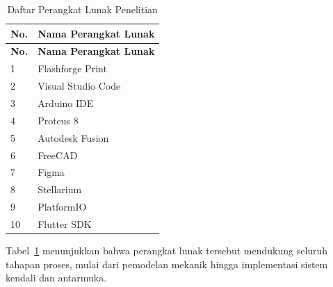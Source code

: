 \begin{longtable}{| b{}|p{}|} %
	\caption{Daftar Perangkat Lunak Penelitian}
	\label{table:3.software} \\
	\hline
	\textbf{No.} & \textbf{Nama Perangkat Lunak} \\
	\hline
	\endfirsthead
	
	\hline
	\textbf{No.} & \textbf{Nama Perangkat Lunak} \\
	\hline
	\endhead
	
	1 & Flashforge Print \\
	\hline
	2 & Visual Studio Code \\
	\hline
	3 & Arduino IDE \\
	\hline
	4 & Proteus 8 \\
	\hline
	5 & Autodesk Fusion \\
	\hline
	6 & FreeCAD \\
	\hline
	7 & Figma \\
	\hline
	8 & Stellarium \\
	\hline
	9 & PlatformIO \\
	\hline
	10 & Flutter SDK \\
	\hline
	
	
\end{longtable}
Tabel~\ref{table:3.software} menunjukkan bahwa perangkat lunak tersebut mendukung seluruh tahapan proses, mulai dari pemodelan mekanik hingga implementasi sistem kendali dan antarmuka.

